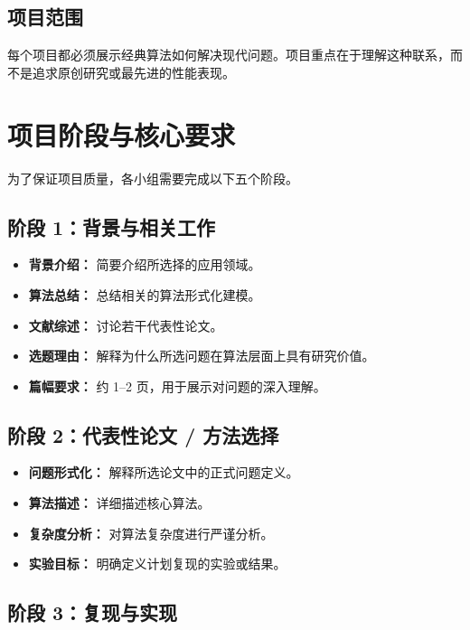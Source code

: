 \documentclass[UTF8, 10pt]{ctexart}
\begin{document}
\subsection{项目范围}

每个项目都必须展示经典算法如何解决现代问题。项目重点在于理解这种联系，而
不是追求原创研究或最先进的性能表现。

\section{项目阶段与核心要求}

为了保证项目质量，各小组需要完成以下五个阶段。

\subsection{阶段 1：背景与相关工作}

\begin{itemize}
    \item \textbf{背景介绍：} 简要介绍所选择的应用领域。
    \item \textbf{算法总结：} 总结相关的算法形式化建模。
    \item \textbf{文献综述：} 讨论若干代表性论文。
    \item \textbf{选题理由：} 解释为什么所选问题在算法层面上具有研究价值。
    \item \textbf{篇幅要求：} 约 1--2 页，用于展示对问题的深入理解。
\end{itemize}

\subsection{阶段 2：代表性论文 / 方法选择}

\begin{itemize}
    \item \textbf{问题形式化：} 解释所选论文中的正式问题定义。
    \item \textbf{算法描述：} 详细描述核心算法。
    \item \textbf{复杂度分析：} 对算法复杂度进行严谨分析。
    \item \textbf{实验目标：} 明确定义计划复现的实验或结果。
\end{itemize}

\subsection{阶段 3：复现与实现}
\end{document}
